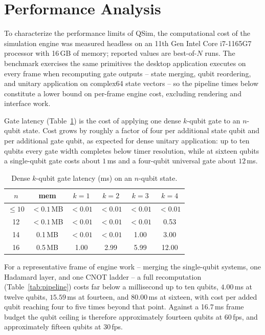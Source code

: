 
\section{Performance Analysis}
\label{sec:performance-analysis}

To characterize the performance limits of QSim, the computational cost of
the simulation engine was measured headless on an 11th Gen Intel Core
i7-1165G7 processor with 16\,GB of memory; reported values are best-of-$N$
runs. The benchmark exercises the same primitives the desktop application
executes on every frame when recomputing gate outputs -- state merging,
qubit reordering, and unitary application on complex64 state vectors -- so
the pipeline times below constitute a lower bound on per-frame engine
cost, excluding rendering and interface work.

Gate latency (Table~\ref{tab:gate-latency}) is the cost of applying one
dense $k$-qubit gate to an $n$-qubit state. Cost grows by roughly a factor
of four per additional state qubit and per additional gate qubit, as
expected for dense unitary application: up to ten qubits every gate width
completes below timer resolution, while at sixteen qubits a single-qubit
gate costs about $1$\,ms and a four-qubit universal gate about $12$\,ms.

\begin{table}[h]
\centering
\caption{Dense $k$-qubit gate latency (ms) on an $n$-qubit state.}
\label{tab:gate-latency}
\begin{tabular}{c|c|cccc}
$n$ & mem & $k=1$ & $k=2$ & $k=3$ & $k=4$ \\ \hline
$\le 10$ & $<0.1$\,MB & $<0.01$ & $<0.01$ & $<0.01$ & $<0.01$ \\
12 & $<0.1$\,MB & $<0.01$ & $<0.01$ & $<0.01$ & 0.53 \\
14 & 0.1\,MB & $<0.01$ & $<0.01$ & 1.00 & 3.00 \\
16 & 0.5\,MB & 1.00 & 2.99 & 5.99 & 12.00 \\
\end{tabular}
\end{table}

For a representative frame of engine work -- merging the single-qubit
systems, one Hadamard layer, and one CNOT ladder -- a full recomputation
(Table~\ref{tab:pipeline}) costs far below a millisecond up to ten qubits,
$4.00$\,ms at twelve qubits, $15.59$\,ms at fourteen, and $80.00$\,ms at
sixteen, with cost per added qubit reaching four to five times beyond that
point. Against a 16.7\,ms frame budget the qubit ceiling is therefore
approximately fourteen qubits at 60\,fps, and approximately fifteen qubits
at 30\,fps.

